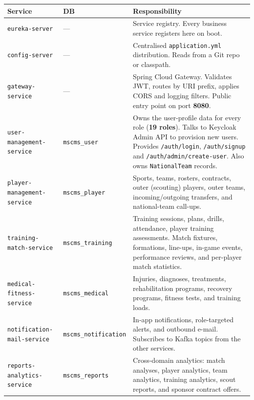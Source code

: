 \documentclass[12pt,a4paper,oneside]{report}
\begin{document}
\begin{longtable}{p{} p{} p{}}
\toprule
\textbf{Service} & \textbf{DB} & \textbf{Responsibility} \\
\midrule\endhead

\texttt{eureka-server} & --- &
  Service registry. Every business service registers here on boot. \\

\texttt{config-server} & --- &
  Centralised \texttt{application.yml} distribution.
  Reads from a Git repo or classpath. \\

\texttt{gateway-service} & --- &
  Spring Cloud Gateway. Validates JWT, routes by URI prefix,
  applies CORS and logging filters. Public entry point on port \textbf{8080}. \\

\texttt{user-management-service} & \texttt{mscms\_user} &
  Owns the user-profile data for every role (\textbf{19 roles}).
  Talks to Keycloak Admin API to provision new users.
  Provides \texttt{/auth/login}, \texttt{/auth/signup} and
  \texttt{/auth/admin/create-user}. Also owns
  \texttt{NationalTeam} records. \\

\texttt{player-management-service} & \texttt{mscms\_player} &
  Sports, teams, rosters, contracts, outer (scouting) players,
  outer teams, incoming/outgoing transfers, and national-team call-ups. \\

\texttt{training-match-service} & \texttt{mscms\_training} &
  Training sessions, plans, drills, attendance, player training
  assessments. Match fixtures, formations, line-ups, in-game events,
  performance reviews, and per-player match statistics. \\

\texttt{medical-fitness-service} & \texttt{mscms\_medical} &
  Injuries, diagnoses, treatments, rehabilitation programs, recovery
  programs, fitness tests, and training loads. \\

\texttt{notification-mail-service} & \texttt{mscms\_notification} &
  In-app notifications, role-targeted alerts, and outbound e-mail.
  Subscribes to Kafka topics from the other services. \\

\texttt{reports-analytics-service} & \texttt{mscms\_reports} &
  Cross-domain analytics: match analyses, player analytics, team
  analytics, training analytics, scout reports, and sponsor contract
  offers. \\
\bottomrule
\end{longtable}
\end{document}
